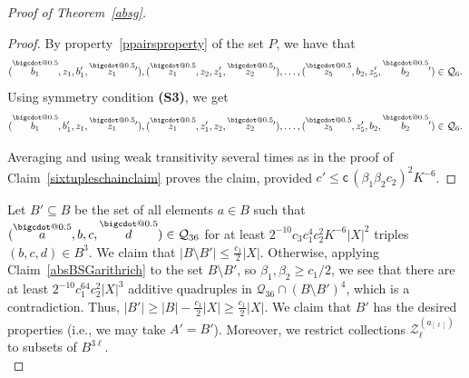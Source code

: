 \documentclass[a4paper,11pt]{article}
\makeatletter
\numberwithin{theorem}{section}
\theoremstyle{definition}
\newcommand*\bcdot{\mathpalette\bigcdot@{0.5}}
\newcommand*\bigcdot@[2]{\mathbin{\vcenter{\hbox{\scalebox{#2}{$\m@th#1\bullet$}}}}}
\newcommand{\bsc}{\bm{\mathsf{c}}}
\newcommand{\upd}[1]{\overset{\bcdot}{#1}}
\makeatother
\begin{document}
\begin{proof}[Proof of Theorem~\ref{absg}]
\begin{proof}
        By property~\eqref{ppairsproperty} of the set $P$, we have that
        \[(\upd{b_1},  z_1, b'_1,\upd{z_1} {}'), (\upd{z_1}, z_2, z'_1, \upd{z_2} {}'), \dots, (\upd{z_5}, b_2, z'_5, \upd{b_2} {}') \in \mathcal{Q}_6.\]
        Using symmetry condition \textbf{(S3)}, we get
        \[(\upd{b_1}, b'_1, z_1, \upd{z_1} {}'), (\upd{z_1}, z'_1, z_2, \upd{z_2} {}'), \dots, (\upd{z_5}, z'_5, b_2, \upd{b_2} {}') \in \mathcal{Q}_6.\]
        
        Averaging and using weak transitivity several times as in the proof of Claim~\ref{sixtupleschainclaim} proves the claim, provided $c' \leq \bsc\, (\beta_1 \beta_2 c_2)^2K^{-6}$.
    \end{proof}
    
\vspace{\baselineskip}

    Let $B' \subseteq B$ be the set of all elements $a \in B$ such that $(\upd a, b, c, \upd d) \in \mathcal{Q}_{36}$ for at least $2^{-10} c_3 c^4_1 c^2_2 K^{-6}|X|^2$ triples $(b,c,d) \in B^3$. We claim that $|B \setminus B'| \leq \frac{c_1}{2}|X|$. Otherwise, applying Claim~\ref{absBSGarithrich} to the set $B \setminus B'$, so $\beta_1, \beta_2 \geq c_1/2$, we see that there are at least  $2^{-10}c_1^64c_2^2 |X|^3$ additive quadruples in $\mathcal{Q}_{36} \cap (B \setminus B')^4$, which is a contradiction. Thus, $|B'| \geq |B| - \frac{c_1}{2}|X| \geq \frac{c_1}{2}|X|$. We claim that $B'$ has the desired properties (i.e., we may take $A' = B'$). Moreover, we restrict collections $\mathcal{Z}_\ell^{(a_{[\ell]})}$ to subsets of $B^{3\ell}$.\\


\end{proof}
\end{document}
